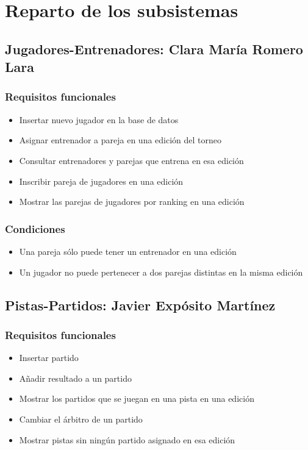 \section{Reparto de los subsistemas}
\subsection{Jugadores-Entrenadores: Clara María Romero Lara}
\subsubsection{Requisitos funcionales}
\begin{itemize}
	\item Insertar nuevo jugador en la base de datos
	\item Asignar entrenador a pareja en una edición del torneo
	\item Consultar entrenadores y parejas que entrena en esa edición
	\item Inscribir pareja de jugadores en una edición
	\item Mostrar las parejas de jugadores por ranking en una edición
\end{itemize}

\subsubsection{Condiciones}
\begin{itemize}
	\item Una pareja sólo puede tener un entrenador en una edición
	\item Un jugador no puede pertenecer a dos parejas distintas en la misma edición
\end{itemize}

\subsection{Pistas-Partidos: Javier Expósito Martínez}
\subsubsection{Requisitos funcionales}
\begin{itemize}
	\item Insertar partido
	\item Añadir resultado a un partido
	\item Mostrar los partidos que se juegan en una pista en una edición
	\item Cambiar el árbitro de un partido
	\item Mostrar pistas sin ningún partido asignado en esa edición
\end{itemize}

